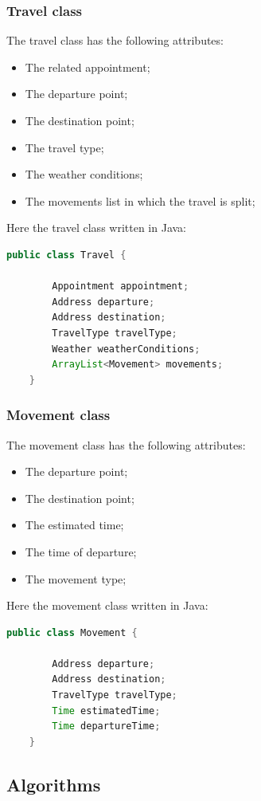 \subsubsection{Travel class}

The travel class has the following attributes:
\begin{itemize}
	\item The related appointment;
	\item The departure point;
	\item The destination point;
	\item The travel type;
	\item The weather conditions;
	\item The movements list in which the travel is split;
\end{itemize}

Here the travel class written in Java:
\begin{lstlisting}[language=Java]
	public class Travel {
	
		Appointment appointment;
		Address departure;
		Address destination;
		TravelType travelType;
		Weather weatherConditions;
		ArrayList<Movement> movements;
	}
\end{lstlisting}

\subsubsection{Movement class}

The movement class has the following attributes:
\begin{itemize}
	\item The departure point;
	\item The destination point;
	\item The estimated time;
	\item The time of departure;
	\item The movement type;
\end{itemize}

Here the movement class written in Java:
\begin{lstlisting}[language=Java]
	public class Movement {
		
		Address departure;
		Address destination;
		TravelType travelType;
		Time estimatedTime;
		Time departureTime;
	}
\end{lstlisting}

\subsection{Algorithms}
